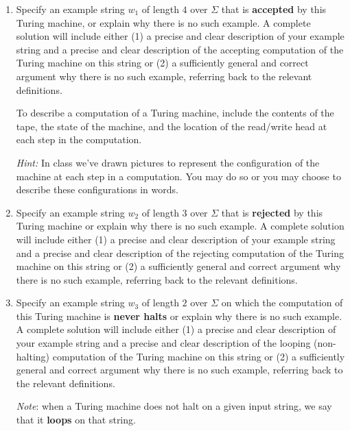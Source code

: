 \begin{enumerate}[wide, labelwidth=!, labelindent=0pt]
    \begin{enumerate}

        \item\gradeCorrect Specify an example string $w_1$ of length $4$ over 
        $\Sigma$ that is {\bf accepted} by this Turing machine, or explain why there is no such 
        example. A complete solution will include either (1) a precise and clear 
        description of your example  string and a precise and clear description of the accepting computation
        of the Turing machine on this string or (2) a sufficiently
        general and correct argument why there is no such example, referring back to the relevant definitions.
        
        To describe a computation of a Turing machine, include the contents of the 
        tape, the state of the machine, and the location of the read/write head at each step in the computation.
        
        {\it Hint:} In class we've drawn pictures to represent the configuration of the machine at each step 
        in a computation.  You may do so or you may choose to describe these configurations in words.
        
        \item\gradeCorrect Specify an example string $w_2$ of length $3$ over $\Sigma$ 
        that is {\bf rejected} by this Turing machine
        or explain why there is no such 
        example. A complete solution will include either (1) a precise and clear 
        description of your example  string and a precise and clear description of the rejecting computation
        of the Turing machine on this string or (2) a sufficiently
        general and correct argument why there is no such example, referring back to the relevant definitions.

        \item\gradeCorrect Specify an example string $w_3$ of length $2$ over $\Sigma$ 
        on which  the computation of this Turing machine is {\bf never halts}
        or explain why there is no such 
        example. A complete solution will include either (1) a precise and clear 
        description of your example  string and a precise and clear description of the looping (non-halting) 
        computation
        of the Turing machine on this string or (2) a sufficiently
        general and correct argument why there is no such example, referring back to the relevant definitions.

        {\it Note}: when a Turing machine does not halt on a given input string, 
        we say that it {\bf loops} on that string.


\end{enumerate}
\end{enumerate}
